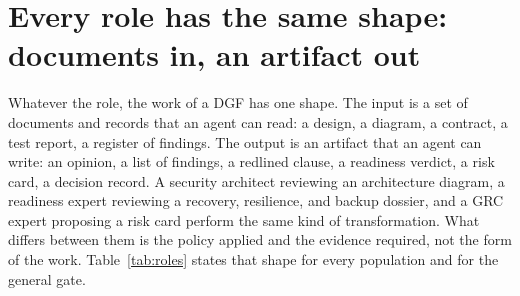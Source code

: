 \section{Every role has the same shape: documents in, an artifact out}
\label{sec:roles}

Whatever the role, the work of a DGF has one shape. The input is a set of documents and records that
an agent can read: a design, a diagram, a contract, a test report, a register of findings. The output
is an artifact that an agent can write: an opinion, a list of findings, a redlined clause, a readiness
verdict, a risk card, a decision record. A security architect reviewing an architecture diagram, a
readiness expert reviewing a recovery, resilience, and backup dossier, and a GRC expert proposing a
risk card perform the same kind of transformation. What differs between them is the policy applied
and the evidence required, not the form of the work. Table~\ref{tab:roles} states that shape for every
population and for the general gate.

